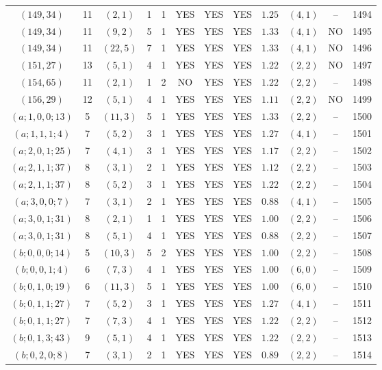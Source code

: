 \begin{longtable}{|c|c|c|c|c|c|c|c|c|c|c|c|}
$(149,34)$ & 11 & $(2,1)$ & 1 & 1 & YES & YES & YES & $1.25$ & $(4,1)$ & -- & 1494\\
$(149,34)$ & 11 & $(9,2)$ & 5 & 1 & YES & YES & YES & $1.33$ & $(4,1)$ & NO & 1495\\
$(149,34)$ & 11 & $(22,5)$ & 7 & 1 & YES & YES & YES & $1.33$ & $(4,1)$ & NO & 1496\\
$(151,27)$ & 13 & $(5,1)$ & 4 & 1 & YES & YES & YES & $1.22$ & $(2,2)$ & NO & 1497\\
$(154,65)$ & 11 & $(2,1)$ & 1 & 2 & NO & YES & YES & $1.22$ & $(2,2)$ & -- & 1498\\
$(156,29)$ & 12 & $(5,1)$ & 4 & 1 & YES & YES & YES & $1.11$ & $(2,2)$ & NO & 1499\\
$(a;1,0,0;13)$ & 5 & $(11,3)$ & 5 & 1 & YES & YES & YES & $1.33$ & $(2,2)$ & -- & 1500\\
$(a;1,1,1;4)$ & 7 & $(5,2)$ & 3 & 1 & YES & YES & YES & $1.27$ & $(4,1)$ & -- & 1501\\
$(a;2,0,1;25)$ & 7 & $(4,1)$ & 3 & 1 & YES & YES & YES & $1.17$ & $(2,2)$ & -- & 1502\\
$(a;2,1,1;37)$ & 8 & $(3,1)$ & 2 & 1 & YES & YES & YES & $1.12$ & $(2,2)$ & -- & 1503\\
$(a;2,1,1;37)$ & 8 & $(5,2)$ & 3 & 1 & YES & YES & YES & $1.22$ & $(2,2)$ & -- & 1504\\
$(a;3,0,0;7)$ & 7 & $(3,1)$ & 2 & 1 & YES & YES & YES & $0.88$ & $(4,1)$ & -- & 1505\\
$(a;3,0,1;31)$ & 8 & $(2,1)$ & 1 & 1 & YES & YES & YES & $1.00$ & $(2,2)$ & -- & 1506\\
$(a;3,0,1;31)$ & 8 & $(5,1)$ & 4 & 1 & YES & YES & YES & $0.88$ & $(2,2)$ & -- & 1507\\
$(b;0,0,0;14)$ & 5 & $(10,3)$ & 5 & 2 & YES & YES & YES & $1.00$ & $(2,2)$ & -- & 1508\\
$(b;0,0,1;4)$ & 6 & $(7,3)$ & 4 & 1 & YES & YES & YES & $1.00$ & $(6,0)$ & -- & 1509\\
$(b;0,1,0;19)$ & 6 & $(11,3)$ & 5 & 1 & YES & YES & YES & $1.00$ & $(6,0)$ & -- & 1510\\
$(b;0,1,1;27)$ & 7 & $(5,2)$ & 3 & 1 & YES & YES & YES & $1.27$ & $(4,1)$ & -- & 1511\\
$(b;0,1,1;27)$ & 7 & $(7,3)$ & 4 & 1 & YES & YES & YES & $1.22$ & $(2,2)$ & -- & 1512\\
$(b;0,1,3;43)$ & 9 & $(5,1)$ & 4 & 1 & YES & YES & YES & $1.22$ & $(2,2)$ & -- & 1513\\
$(b;0,2,0;8)$ & 7 & $(3,1)$ & 2 & 1 & YES & YES & YES & $0.89$ & $(2,2)$ & -- & 1514\\

\end{longtable}
